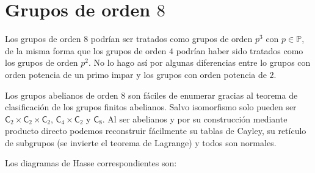 \documentclass[12pt,a4paper,fleqn,spanish,final,openright]{extbook}
\theoremstyle{definition}
\theoremstyle{remark}
\begin{document}
    \chapter{Grupos de orden $8$}

    Los grupos de orden $8$ podrían ser tratados como grupos de orden $p^3$ con $p   \in \mathds{P}$, de la misma forma que los grupos de orden $4$ podrían haber sido tratados como los grupos de orden $p^2$. No lo hago así por algunas diferencias entre lo grupos con orden potencia de un primo impar y los grupos con orden potencia de $2$.

    Los grupos abelianos de orden $8$ son fáciles de enumerar gracias al teorema de clasificación de los grupos finitos abelianos. Salvo isomorfismo solo pueden ser $\mathsf{C}_{2}   \times   \mathsf{C}_{2}   \times   \mathsf{C}_{2}$, $\mathsf{C}_{4}   \times   \mathsf{C}_{2}$ y $\mathsf{C}_{8}$. Al ser abelianos y por su construcción mediante producto directo podemos reconstruir fácilmente su tablas de Cayley, su retículo de subgrupos (se invierte el teorema de Lagrange) y todos son normales.

    Los diagramas de Hasse correspondientes son:
\end{document}
